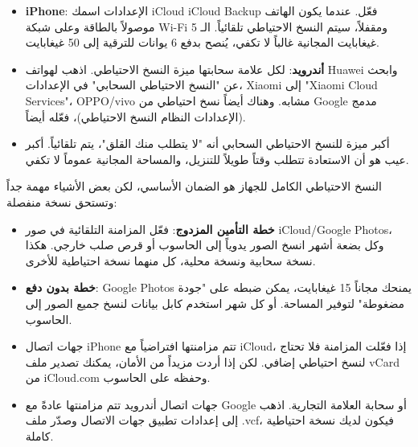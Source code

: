 
\begin{itemize}
  \item \textbf{iPhone}: الإعدادات اسمك iCloud iCloud Backup فعّل. عندما يكون الهاتف موصولاً بالطاقة وعلى شبكة Wi-Fi ومقفلاً، سيتم النسخ الاحتياطي تلقائياً. الـ 5 غيغابايت المجانية غالباً لا تكفي، يُنصح بدفع 6 يوانات للترقية إلى 50 غيغابايت.
  \item \textbf{أندرويد}: لكل علامة سحابتها ميزة النسخ الاحتياطي. اذهب لهواتف Huawei وابحث عن "النسخ الاحتياطي السحابي" في الإعدادات، Xiaomi إلى "Xiaomi Cloud Services"، OPPO/vivo مشابه. وهناك أيضاً نسخ احتياطي من Google مدمج (الإعدادات النظام النسخ الاحتياطي)، فعّله أيضاً.
  \item أكبر ميزة للنسخ الاحتياطي السحابي أنه "لا يتطلب منك القلق"، يتم تلقائياً. أكبر عيب هو أن الاستعادة تتطلب وقتاً طويلاً للتنزيل، والمساحة المجانية عموماً لا تكفي.
\end{itemize}


النسخ الاحتياطي الكامل للجهاز هو الضمان الأساسي، لكن بعض الأشياء مهمة جداً وتستحق نسخة منفصلة:


\begin{itemize}
  \item \textbf{خطة التأمين المزدوج}: فعّل المزامنة التلقائية في صور iCloud/Google Photos، وكل بضعة أشهر انسخ الصور يدوياً إلى الحاسوب أو قرص صلب خارجي. هكذا نسخة سحابية ونسخة محلية، كل منهما نسخة احتياطية للأخرى.
  \item \textbf{خطة بدون دفع}: Google Photos يمنحك مجاناً 15 غيغابايت، يمكن ضبطه على "جودة مضغوطة" لتوفير المساحة. أو كل شهر استخدم كابل بيانات لنسخ جميع الصور إلى الحاسوب.
\end{itemize}


\begin{itemize}
  \item جهات اتصال iPhone تتم مزامنتها افتراضياً مع iCloud، إذا فعّلت المزامنة فلا تحتاج لنسخ احتياطي إضافي. لكن إذا أردت مزيداً من الأمان، يمكنك تصدير ملف vCard من iCloud.com وحفظه على الحاسوب.
  \item جهات اتصال أندرويد تتم مزامنتها عادةً مع Google أو سحابة العلامة التجارية. اذهب إلى إعدادات تطبيق جهات الاتصال وصدّر ملف .vcf، فيكون لديك نسخة احتياطية كاملة.
\end{itemize}

